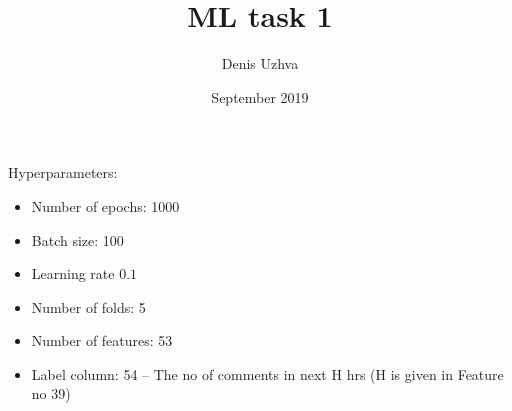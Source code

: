 \documentclass{article}
\begin{document}
\title{ML task 1}
\author{Denis Uzhva}
\date{September 2019}
\maketitle

Hyperparameters:
\begin{itemize}
    \item Number of epochs: 1000
    \item Batch size: 100
    \item Learning rate $0.1$
    \item Number of folds: 5
    \item Number of features: 53
    \item Label column: 54 -- The no of comments in next H hrs (H is given in Feature no 39)
\end{itemize}
\end{document}

